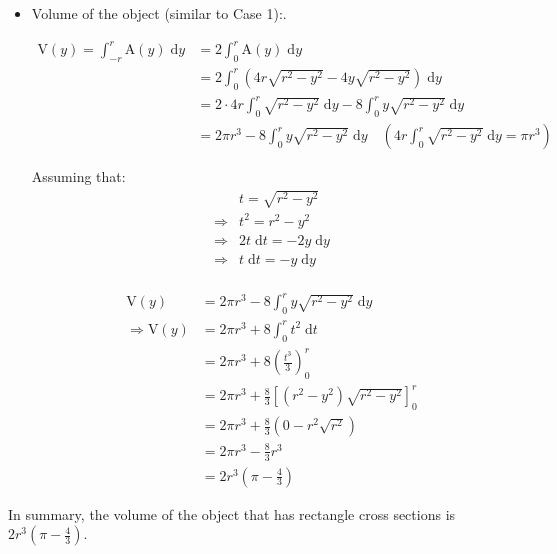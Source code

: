 \documentclass[12pt]{article}
\begin{document}
\begin{enumerate}
\begin{itemize}
    \item Volume of the object (similar to Case 1):. \par
    \begin{align*}
    \mathrm{V}(y) = \int_{-r}^r \mathrm{A}(y)\; \mathrm{d}y
    &=2 \int_{0}^r \mathrm{A}(y)\; \mathrm{d}y \\
    &=2 \int_{0}^r\left( 4r\sqrt{r^2-y^2}-4y\sqrt{r^2-y^2}\right) \; \mathrm{d}y\\
    &=2\cdot 4r \int_{0}^r \sqrt{r^2-y^2}\; \mathrm{d}y
    - 8\int_{0}^r y\sqrt{r^2-y^2} \; \mathrm{d}y\\
    &=2\pi r^3
    - 8\int_{0}^r y\sqrt{r^2-y^2} \; \mathrm{d}y
    \quad \left(4r \int_{0}^r \sqrt{r^2-y^2} \; \mathrm{d}y=\pi r^3\right)
    \end{align*}
    
    Assuming that:
    \begin{align*}
        &t=\sqrt{r^2-y^2}\\
        \Longrightarrow &t^2 = r^2-y^2\\
        \Longrightarrow &2t\; \mathrm{d}t = -2y\;\mathrm{d}y\\
        \Longrightarrow &t\; \mathrm{d}t = -y\;\mathrm{d}y\\
    \end{align*}
    
    \begin{align*}
        \mathrm{V}(y) &=2\pi r^3
        - 8\int_{0}^r y\sqrt{r^2-y^2} \; \mathrm{d}y\\
        \Longrightarrow \mathrm{V}(y)
        &=2\pi r^3
        + 8\int_{0}^r t^2 \; \mathrm{d}t\\
        &=2\pi r^3
        + 8\left(\frac{t^3}{3}\right)_0^r\\
        &=2\pi r^3
        + \frac{8}{3}\left[\left(r^2-y^2 \right) \sqrt{r^2-y^2}\right]_0^r \\
        &=2\pi r^3
        + \frac{8}{3}\left(0 -r^2 \sqrt{r^2} \right) \\
        &=2\pi r^3- \frac{8}{3}r^3\\
        &=2r^3 \left(\pi -\frac{4}{3}\right)
    \end{align*}

        \end{itemize}
    
    In summary, the volume of the object that has rectangle cross sections is $ 2r^3\left(\pi -\frac{4}{3}\right)$.
    
    \end{enumerate}

    
\end{document}
